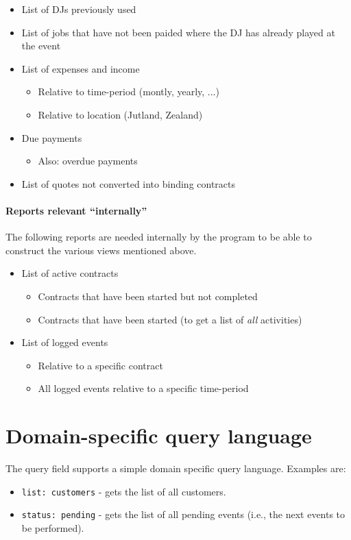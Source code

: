 \documentclass[envcountsame]{llncs}
\begin{document}
\begin{itemize}
\item List of DJs previously used
\item List of jobs that have not been paided where the DJ has already
  played at the event
\item List of expenses and income
  \begin{itemize}
  \item Relative to time-period (montly, yearly, ...)
  \item Relative to location (Jutland, Zealand)
  \end{itemize}
\item Due payments 
  \begin{itemize}
  \item Also: overdue payments
  \end{itemize}
\item List of quotes not converted into binding contracts
\end{itemize}


\paragraph{Reports relevant ``internally''}

The following reports are needed internally by the program to be able
to construct the various views mentioned above.

\begin{itemize}
\item List of active contracts
  \begin{itemize}
  \item Contracts that have been started but not completed
  \item Contracts that have been started (to get a list of \emph{all}
    activities)
  \end{itemize}
\item List of logged events 
  \begin{itemize}
  \item Relative to a specific contract
  \item All logged events relative to a specific time-period
  \end{itemize}
\end{itemize}

\section{Domain-specific query language}
\label{sec:doma-spec-query}
The query field supports a simple domain specific query
language. Examples are:
\begin{itemize}
\item \texttt{list: customers} - gets the list of all customers.
\item \texttt{status: pending} - gets the list of all pending events
  (i.e., the next events to be performed).
\end{itemize}
\end{document}

